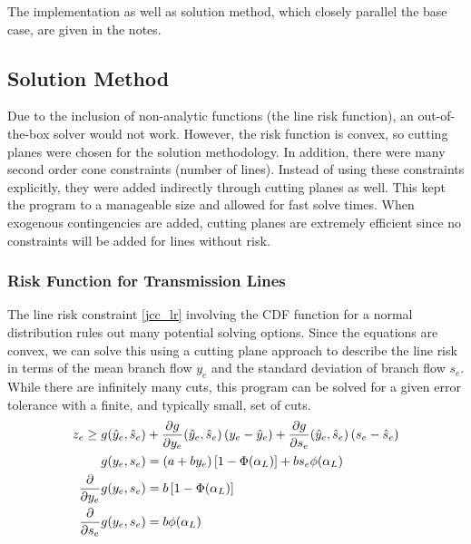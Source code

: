 The implementation as well as solution method, which closely parallel the base case, are given in the notes.
\endnote{}

\subsection{Solution Method}
Due to the inclusion of non-analytic functions (the line risk function), an out-of-the-box solver would not work.  However, the risk function is convex, so cutting planes were chosen for the solution methodology.  In addition, there were many second order cone constraints (number of lines).  Instead of using these constraints explicitly, they were added indirectly through cutting planes as well.  This kept the program to a manageable size and allowed for fast solve times.  When exogenous contingencies are added, cutting planes are extremely efficient since no constraints will be added for lines without risk.


\subsubsection*{Risk Function for Transmission Lines}
The line risk constraint \ref{jcc_lr} involving the CDF function for a normal distribution rules out many potential solving options.  Since the equations are convex, we can solve this using a cutting plane approach to describe the line risk in terms of the mean branch flow $y_e$ and the standard deviation of branch flow $s_e$.  While there are infinitely many cuts, this program can be solved for a given error tolerance with a finite, and typically small, set of cuts.
\begin{subequations}
\label{line_risk_cuts}
\begin{align}
z_e \geq g(\hat{y}_e,\hat{s}_e) &+ \frac{\partial g}{\partial y_e}(\hat{y}_e,\hat{s}_e) \left(y_e - \hat{y}_e \right) 
+ \frac{\partial g}{\partial s_e}(\hat{y}_e,\hat{s}_e) \left(s_e - \hat{s}_e \right) \\
g(y_e,s_e) &= (a + b y_e)\left[ 1 - \Phi(\alpha_L) \right]  + b s_e \phi(\alpha_L)  \\
 \frac{\partial}{\partial y_e}g(y_e,s_e) &= b\left[ 1 - \Phi(\alpha_L) \right]\\
\frac{\partial}{\partial s_e}g(y_e,s_e) &= b \phi(\alpha_L) 
\end{align}
\end{subequations}


